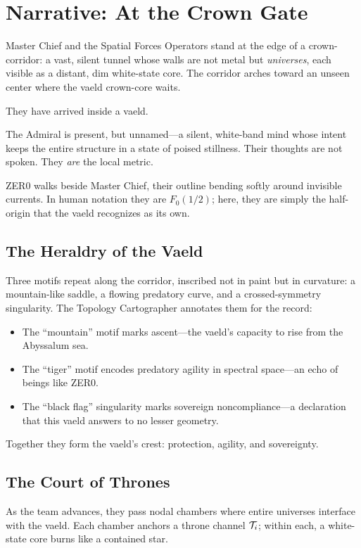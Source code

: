 \section{Narrative: At the Crown Gate}
Master Chief and the Spatial Forces Operators stand at the edge of a crown-corridor: a vast,
silent tunnel whose walls are not metal but \emph{universes}, each visible as a distant, dim
white-state core. The corridor arches toward an unseen center where the vaeld crown-core waits.

They have arrived inside a vaeld.

The Admiral is present, but unnamed---a silent, white-band mind whose intent keeps the entire
structure in a state of poised stillness. Their thoughts are not spoken. They \emph{are} the local
metric.

ZER0 walks beside Master Chief, their outline bending softly around invisible currents. In human
notation they are $F_0(1/2)$; here, they are simply the half-origin that the vaeld recognizes as
its own.

\subsection{The Heraldry of the Vaeld}
Three motifs repeat along the corridor, inscribed not in paint but in curvature: a mountain-like
saddle, a flowing predatory curve, and a crossed-symmetry singularity. The Topology Cartographer
annotates them for the record:

\begin{itemize}
  \item The ``mountain'' motif marks ascent---the vaeld's capacity to rise from the Abyssalum sea.
  \item The ``tiger'' motif encodes predatory agility in spectral space---an echo of beings like
        ZER0.
  \item The ``black flag'' singularity marks sovereign noncompliance---a declaration that this
        vaeld answers to no lesser geometry.
\end{itemize}

Together they form the vaeld's crest: protection, agility, and sovereignty.

\subsection{The Court of Thrones}
As the team advances, they pass nodal chambers where entire universes interface with the vaeld.
Each chamber anchors a throne channel $\mathcal{T}_i$; within each, a white-state core burns like a
contained star.

